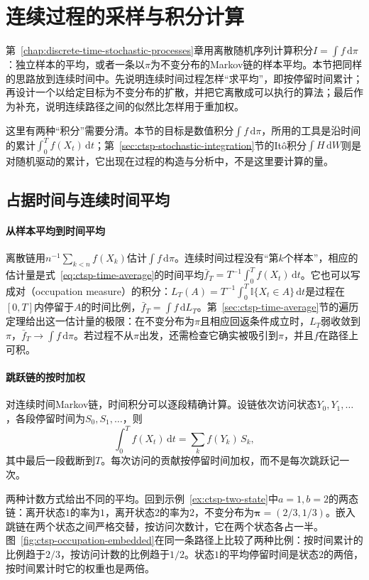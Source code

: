 \section{连续过程的采样与积分计算}
\label{sec:ctsp-sampling}

第~\ref{chap:discrete-time-stochastic-processes}章用离散随机序列计算积分$I=\int f\,\mathrm d\pi$：独立样本的平均，或者一条以$\pi$为不变分布的Markov链的样本平均。本节把同样的思路放到连续时间中。先说明连续时间过程怎样“求平均”，即按停留时间累计；再设计一个以给定目标为不变分布的扩散，并把它离散成可以执行的算法；最后作为补充，说明连续路径之间的似然比怎样用于重加权。

这里有两种“积分”需要分清。本节的目标是数值积分$\int f\,\mathrm d\pi$，所用的工具是沿时间的累计$\int_0^Tf(X_t)\,\mathrm dt$；第~\ref{sec:ctsp-stochastic-integration}节的Itô积分$\int H\,\mathrm dW$则是对随机驱动的累计，它出现在过程的构造与分析中，不是这里要计算的量。

\subsection{占据时间与连续时间平均}
\label{sec:ctsp-occupation}

\paragraph{从样本平均到时间平均}
离散链用$n^{-1}\sum_{k<n}f(X_k)$估计$\int f\,\mathrm d\pi$。连续时间过程没有“第$k$个样本”，相应的估计量是式~\eqref{eq:ctsp-time-average}的时间平均$\bar f_T=T^{-1}\int_0^Tf(X_t)\,\mathrm dt$。它也可以写成对（occupation measure）的积分：$L_T(A)=T^{-1}\int_0^T\mathbb I\{X_t\in A\}\,\mathrm dt$是过程在$[0,T]$内停留于$A$的时间比例，$\bar f_T=\int f\,\mathrm dL_T$。第~\ref{sec:ctsp-time-average}节的遍历定理给出这一估计量的极限：在不变分布为$\pi$且相应回返条件成立时，$L_T$弱收敛到$\pi$，$\bar f_T\to\int f\,\mathrm d\pi$。若过程不从$\pi$出发，还需检查它确实被吸引到$\pi$，并且$f$在路径上可积。

\paragraph{跳跃链的按时加权}
对连续时间Markov链，时间积分可以逐段精确计算。设链依次访问状态$Y_0,Y_1,\ldots$，各段停留时间为$S_0,S_1,\ldots$，则
\[
  \int_0^Tf(X_t)\,\mathrm dt=\sum_kf(Y_k)\,S_k ,
\]
其中最后一段截断到$T$。每次访问的贡献按停留时间加权，而不是每次跳跃记一次。

两种计数方式给出不同的平均。回到示例~\ref{ex:ctsp-two-state}中$a=1,b=2$的两态链：离开状态$1$的率为$1$，离开状态$2$的率为$2$，不变分布为$\bm\pi=(2/3,1/3)$。嵌入跳链在两个状态之间严格交替，按访问次数计，它在两个状态各占一半。图~\ref{fig:ctsp-occupation-embedded}在同一条路径上比较了两种比例：按时间累计的比例趋于$2/3$，按访问计数的比例趋于$1/2$。状态$1$的平均停留时间是状态$2$的两倍，按时间累计时它的权重也是两倍。

